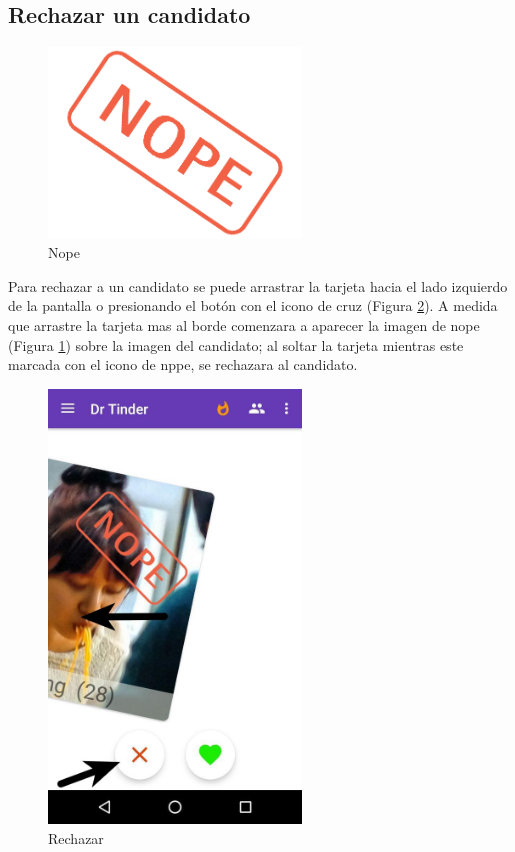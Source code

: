 \documentclass[10pt,letterpaper,extrafontsizes]{memoir}
\begin{document}
\subsection{Rechazar un candidato}

\begin{figure}[H]
    \centering
\includegraphics[width=0.6\textwidth]{graficos/imagenes/nope}
    \caption{Nope}
    \label{fig:nope}
\end{figure}

Para rechazar a un candidato se puede arrastrar la tarjeta hacia el lado izquierdo de la pantalla o presionando el botón con el icono de cruz (Figura \ref{fig:dnope}). A medida que arrastre la tarjeta mas al borde comenzara a aparecer la imagen de nope (Figura \ref{fig:nope}) sobre la imagen del candidato; al soltar la tarjeta mientras este marcada con el icono de nppe, se rechazara al candidato.

\begin{figure}[H]
    \centering
\includegraphics[width=0.6\textwidth]{graficos/capturas/n}
    \caption{Rechazar}
    \label{fig:dnope}
\end{figure}
\end{document}
